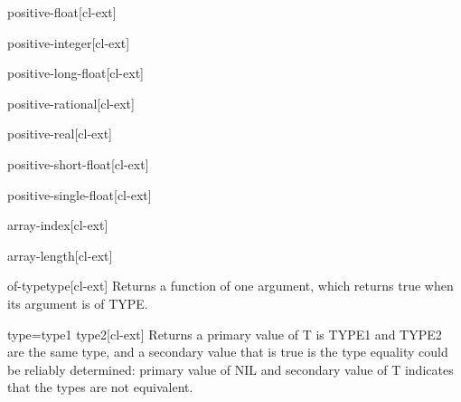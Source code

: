 \documentclass[10pt,english]{book}
\begin{document}
\begin{type}{positive-float}{}[cl-ext]
  
\end{type}

\begin{type}{positive-integer}{}[cl-ext]
  
\end{type}

\begin{type}{positive-long-float}{}[cl-ext]
  
\end{type}

\begin{type}{positive-rational}{}[cl-ext]
  
\end{type}

\begin{type}{positive-real}{}[cl-ext]
  
\end{type}

\begin{type}{positive-short-float}{}[cl-ext]
  
\end{type}

\begin{type}{positive-single-float}{}[cl-ext]
  
\end{type}

\begin{type}{array-index}{}[cl-ext]
  
\end{type}

\begin{type}{array-length}{}[cl-ext]
  
\end{type}

\begin{function}{of-type}{type}[cl-ext]
  Returns a function of one argument, which returns true when its argument is
of TYPE.
\end{function}

\begin{function}{type=}{type1 type2}[cl-ext]
  Returns a primary value of T is TYPE1 and TYPE2 are the same type,
and a secondary value that is true is the type equality could be reliably
determined: primary value of NIL and secondary value of T indicates that the
types are not equivalent.
\end{function}
\end{document}
